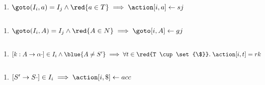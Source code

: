 \begin{frame}{}
  \begin{center}
    \begin{enumerate}[(1)]
      \centering
      \item $\goto(I_{i}, a) = I_{j} \land \red{a \in T} \implies \action[i, a] \gets sj$
    \end{enumerate}

    \begin{columns}
        
    \end{columns}

    \vspace{0.20cm}
    \begin{enumerate}[(2)]
      \centering
      \item $\goto(I_{i}, A) = I_{j} \land \red{A \in N} \implies \goto[i, A] \gets gj$
    \end{enumerate}
  \end{center}
\end{frame}

\begin{frame}{}
  \begin{center}
    \begin{columns}
        
    \end{columns}

    \vspace{0.20cm}
    \begin{enumerate}[(3)]
      \centering
      \item $[k: A \to \alpha \cdot] \in I_{i} \land \blue{A \neq S'} \implies
        \forall t \in \red{T \cup \set{\$}}.\; \action[i, t] = rk$
    \end{enumerate}
  \end{center}
\end{frame}

\begin{frame}{}
  \begin{center}
    \begin{columns}
        
    \end{columns}

    \vspace{0.20cm}
    \begin{enumerate}[(4)]
      \centering
      \item $[S' \to S \cdot] \in I_{i} \implies \action[i, \$] \gets acc$
    \end{enumerate}
  \end{center}
\end{frame}


